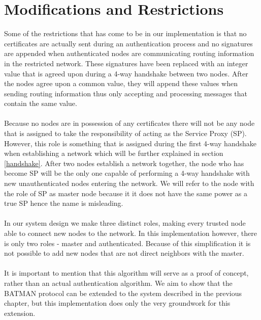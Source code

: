 \section{Modifications and Restrictions}
Some of the restrictions that has come to be in our implementation is that no certificates are actually sent during an authentication process and no signatures are appended when authenticated nodes are communicating routing information in the restricted network. These signatures have been replaced with an integer value that is agreed upon during a 4-way handshake between two nodes. After the nodes agree upon a common value, they will append these values when sending routing information thus only accepting and processing messages that contain the same value.
\\\\
Because no nodes are in possession of any certificates there will not be any node that is assigned to take the responsibility of acting as the Service Proxy (SP). However, this role is something that is assigned during the first 4-way handshake when establishing a network which will be further explained in section \ref{handshake}. After two nodes establish a network together, the node who has become SP will be the only one capable of performing a 4-way handshake with new unauthenticated nodes entering the network. We will refer to the node with the role of SP as master node because it it does not have the same power as a true SP hence the name is misleading.
\\\\
In our system design we make three distinct roles, making every trusted node able to connect new nodes to the network. In this implementation however, there is only two roles - master and authenticated. Because of this simplification it is not possible to add new nodes that are not direct neighbors with the master.
\\\\
It is important to mention that this algorithm will serve as a proof of concept, rather than an actual authentication algorithm. We aim to show that the BATMAN protocol can be extended to the system described in the previous chapter, but this implementation does only the very groundwork for this extension.

